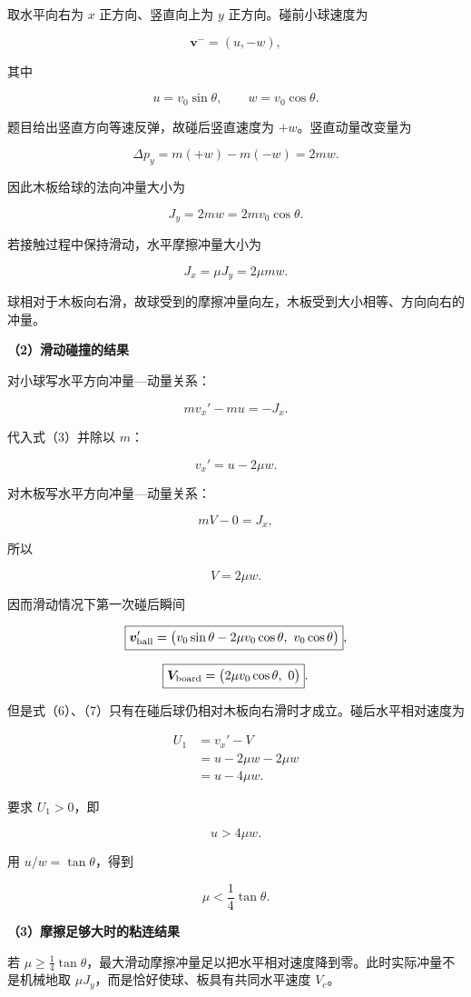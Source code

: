 \documentclass[12pt,a4paper,UTF8]{ctexart}
\begin{document}
取水平向右为 \(x\) 正方向、竖直向上为 \(y\) 正方向。碰前小球速度为

\[\bm v^-=(u,-w),\]

其中

\[u=v_0\sin\theta,\qquad w=v_0\cos\theta.\]

题目给出竖直方向等速反弹，故碰后竖直速度为 \(+w\)。竖直动量改变量为

\[\Delta p_y=m(+w)-m(-w)=2mw.\]

因此木板给球的法向冲量大小为

\[J_y=2mw=2mv_0\cos\theta.\]

若接触过程中保持滑动，水平摩擦冲量大小为

\[J_x=\mu J_y=2\mu mw.\]

球相对于木板向右滑，故球受到的摩擦冲量向左，木板受到大小相等、方向向右的冲量。

\textbf{（2）滑动碰撞的结果}

对小球写水平方向冲量---动量关系：

\[mv_x'-mu=-J_x.\]

代入式（3）并除以 \(m\)：

\[v_x'=u-2\mu w.\]

对木板写水平方向冲量---动量关系：

\[mV-0=J_x,\]

所以

\[V=2\mu w.\]

因而滑动情况下第一次碰后瞬间

\[\boxed{\bm v'_{\rm ball}=\bigl(v_0\sin\theta-2\mu v_0\cos\theta,\ v_0\cos\theta\bigr)},\]

\[\boxed{\bm V_{\rm board}=\bigl(2\mu v_0\cos\theta,\ 0\bigr)}.\]

但是式（6）、（7）只有在碰后球仍相对木板向右滑时才成立。碰后水平相对速度为

\[\begin{aligned}
U_1&=v_x'-V\\
&=u-2\mu w-2\mu w\\
&=u-4\mu w.
\end{aligned}\]

要求 \(U_1>0\)，即

\[u>4\mu w.\]

用 \(u/w=\tan\theta\)，得到

\[\mu<\frac14\tan\theta.\]

\textbf{（3）摩擦足够大时的粘连结果}

若
\(\mu\geq\tfrac14\tan\theta\)，最大滑动摩擦冲量足以把水平相对速度降到零。此时实际冲量不是机械地取
\(\mu J_y\)，而是恰好使球、板具有共同水平速度 \(V_c\)。
\end{document}
